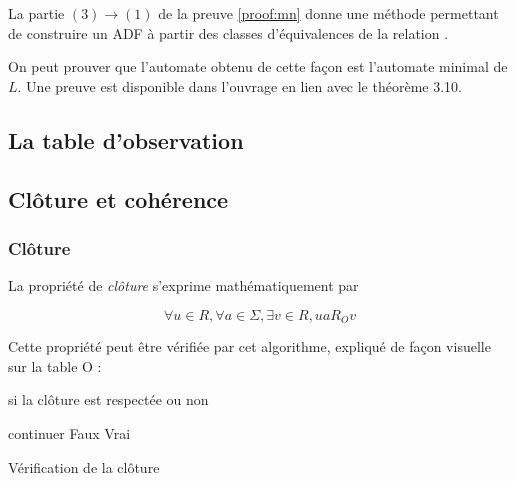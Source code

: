 	\begin{corollary}
		La partie $(3)\rightarrow(1)$ de la preuve \ref{proof:mn} donne une méthode permettant de construire un ADF à partir des classes d'équivalences de la relation \rl.
	\end{corollary}

On peut prouver que l'automate obtenu de cette façon est l'automate minimal de $L$. Une preuve est disponible dans l'ouvrage \cite{Hopcroft79} en lien avec le théorème 3.10.



  \subsection{La table d'observation}


\subsection{Clôture et cohérence}

\subsubsection*{Clôture}
La propriété de \emph{clôture} s'exprime mathématiquement par

$$ \forall u \in R, \forall a \in \Sigma, \exists v \in R, ua R_O v$$

Cette propriété peut être vérifiée par cet algorithme, expliqué de façon visuelle sur la table O :

\begin{algorithm}[H]
	\begin{algorithmic}[1]
		\ENSURE si la clôture est respectée ou non

				\STATE continuer
			\ELSE
				\STATE {}
					\RETURN Faux
				\ENDIF
			\ENDIF
		\ENDFOR
		\ENDFOR
		\RETURN Vrai
	\end{algorithmic}
	\caption{Vérification de la clôture}\label{alg:cloture}
\end{algorithm}

